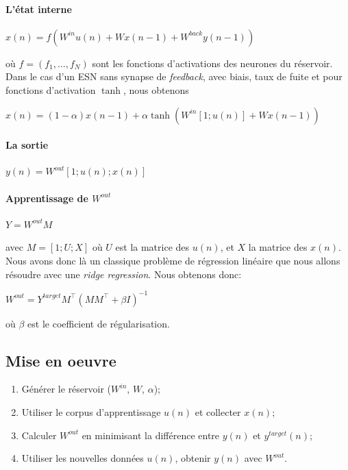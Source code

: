 \documentclass[12pt]{article}
\begin{document}
\paragraph{L'état interne}
\begin{center}
$x(n) = f(W^{in}u(n) + Wx(n-1) + W^{back}y(n-1) )$
\end{center}
où $f=(f_{1},...,f_{N})$ sont les fonctions d'activations des neurones du réservoir.\newline
Dans le cas d'un ESN sans synapse de \textit{feedback}, avec biais, taux de fuite et pour fonctions d'activation $\tanh$, nous obtenons
\begin{center}
$x(n) = (1-\alpha)x(n-1) + \alpha\tanh(W^{in}[1;u(n)] + Wx(n-1))$
\end{center}
\paragraph{La sortie}
\begin{center}
$y(n)= W^{out}[1;u(n);x(n)]$
\end{center}
\paragraph{Apprentissage de $W^{out}$}
\begin{center}
$Y = W^{out}M$
\end{center}
avec $M = [1; U; X]$ où $U$ est la matrice des $u(n)$, et $X$ la matrice des $x(n)$. Nous avons donc là un classique problème de régression linéaire que nous allons résoudre avec une \textit{ridge regression}. Nous obtenons donc:
\begin{center}
$W^{out} = Y^{target} M^\top (MM^\top + \beta I)^{-1}$
\end{center}
où $\beta$ est le coefficient de régularisation.

\subsection{Mise en oeuvre}
\begin{enumerate}
\item Générer le réservoir ($W^{in}$, $W$, $\alpha$);
\item Utiliser le corpus d'apprentissage $u(n)$ et collecter $x(n)$;
\item Calculer $W^{out}$ en minimisant la différence entre  $y(n)$ et $y^{target}(n)$;
\item Utiliser les nouvelles données $u(n)$, obtenir  $y(n)$ avec $W^{out}$.
\end{enumerate}
\end{document}

